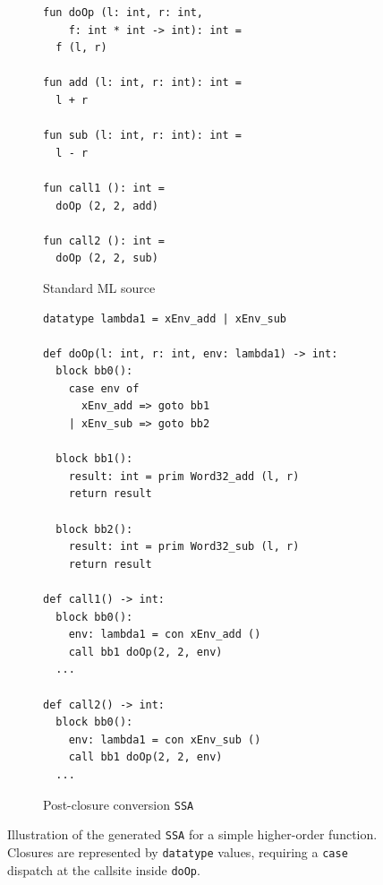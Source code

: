 \begin{figure}[!htb]
  \centering
  \begin{subfigure}[t]{0.40\textwidth}
    \caption{Standard ML source}
    \label{fig:hofo_no_polyvar_sml}
    \vspace{1mm}
\begin{verbatim}
fun doOp (l: int, r: int,
    f: int * int -> int): int =
  f (l, r)

fun add (l: int, r: int): int =
  l + r

fun sub (l: int, r: int): int =
  l - r

fun call1 (): int =
  doOp (2, 2, add)

fun call2 (): int =
  doOp (2, 2, sub)
\end{verbatim}
  \end{subfigure}\hfill
  \begin{subfigure}[t]{0.58\textwidth}
    \caption{Post-closure conversion \texttt{SSA}}
    \label{fig:hofo_no_polyvar_ssa}
    \vspace{1mm}
\begin{verbatim}
datatype lambda1 = xEnv_add | xEnv_sub

def doOp(l: int, r: int, env: lambda1) -> int:
  block bb0():
    case env of
      xEnv_add => goto bb1
    | xEnv_sub => goto bb2

  block bb1():
    result: int = prim Word32_add (l, r)
    return result

  block bb2():
    result: int = prim Word32_sub (l, r)
    return result

def call1() -> int:
  block bb0():
    env: lambda1 = con xEnv_add ()
    call bb1 doOp(2, 2, env)
  ...

def call2() -> int:
  block bb0():
    env: lambda1 = con xEnv_sub ()
    call bb1 doOp(2, 2, env)
  ...
\end{verbatim}
  \end{subfigure}
  \caption{Illustration of the generated \texttt{SSA} for a simple higher-order
    function. Closures are represented by \texttt{datatype} values, requiring a
    \texttt{case} dispatch at the callsite inside \texttt{doOp}.}
  \label{fig:hofo_no_polyvar}
\end{figure}


